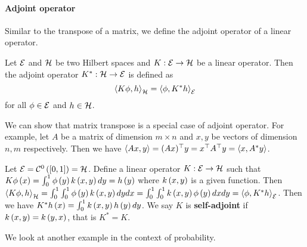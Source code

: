 \paragraph{Adjoint operator} Similar to the transpose of a matrix, we define the adjoint operator of a linear operator.
\begin{definition}
    Let $\mathcal{E}$ and $\mathcal{H}$ be two Hilbert spaces and $K:\mathcal{E}\rightarrow\mathcal{H}$ be a linear operator. Then the adjoint operator $K^*:\mathcal{H}\rightarrow\mathcal{E}$ is defined as
    \begin{equation*}
        \left\langle K\phi,h\right\rangle_{\mathcal{H}}=\left\langle \phi,K^*h\right\rangle_{\mathcal{E}}
    \end{equation*}
    for all $\phi\in\mathcal{E}$ and $h\in\mathcal{H}$.
\end{definition}
\begin{remark}
    We can show that matrix transpose is a special case of adjoint operator. For example, let $A$ be a matrix of dimension $m\times n$ and $x,y$ be vectors of dimension $n,m$ respectively. Then we have $\left\langle Ax,y\right\rangle=(Ax)^\top y= x^\top A^\top y = \left\langle x,A^*y\right\rangle$. 
\end{remark}
\begin{example}
    Let $\mathcal{E} = \mathcal{C}^0\left(\left[0,1\right]\right)=\mathcal{H}$. Define a linear operator $K:\mathcal{E}\rightarrow\mathcal{H}$ such that $K\phi\left(x\right)=\int_0^1\phi\left(y\right)k\left(x,y\right)dy= h\left(y\right)$ where $k\left(x,y\right)$ is a given function. Then $\left\langle K\phi,h\right\rangle_{\mathcal{H}}=\int_0^1\int_0^1\phi\left(y\right)k\left(x,y\right)dydx=\int_0^1\int_0^1k\left(x,y\right)\phi\left(y\right)dxdy=\left\langle \phi,K^*h\right\rangle_{\mathcal{E}}$. Then we have $K^*h\left(x\right)=\int_0^1k\left(x,y\right)h\left(y\right)dy$. We say $K$ is \textbf{self-adjoint} if $k\left(x,y\right)=k\left(y,x\right)$, that is $K^*=K$.
\end{example}
We look at another example in the context of probability.
\begin{example}
    
\end{example}






